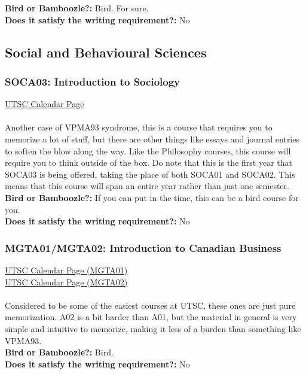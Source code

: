 \documentclass[11pt]{article}
\begin{document}
\textbf{Bird or Bamboozle?:} Bird. For sure.\\

\textbf{Does it satisfy the writing requirement?:} No

\subsection{Social and Behavioural Sciences}
\subsubsection{SOCA03: Introduction to Sociology}
\href{https://utsc.calendar.utoronto.ca/course/soca03y3}{UTSC Calendar Page}\\\\
Another case of VPMA93 syndrome, this is a course that requires you to memorize a lot of stuff, but there are other things like essays and journal entries to soften the blow along the way.  Like the Philosophy courses, this course will require you to think outside of the box. Do note that this is the first year that SOCA03 is being offered, taking the place of both SOCA01 and SOCA02.  This means that this course will span an entire year rather than just one semester.\\

\textbf{Bird or Bamboozle?:}  If you can put in the time, this can be a bird course for you.\\

\textbf{Does it satisfy the writing requirement?:} No

\subsubsection{MGTA01/MGTA02: Introduction to Canadian Business}
\href{https://utsc.calendar.utoronto.ca/course/MGTA01H3}{UTSC Calendar Page (MGTA01)}\\
\href{https://utsc.calendar.utoronto.ca/course/MGTA02H3}{UTSC Calendar Page (MGTA02)}\\\\
Considered to be some of the easiest courses at UTSC, these ones are just pure memorization.  A02 is a bit harder than A01, but the material in general is very simple and intuitive to memorize, making it less of a burden than something like VPMA93.\\

\textbf{Bird or Bamboozle?:} Bird.\\

\textbf{Does it satisfy the writing requirement?:} No
\end{document}
